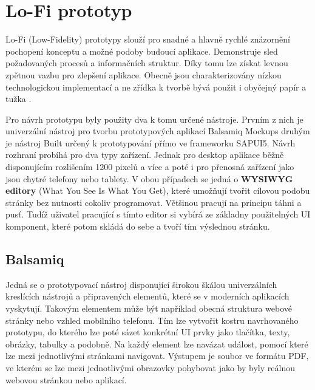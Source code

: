 \documentclass[thesis=M,czech]{FITthesis}[2012/06/26]
\begin{document}
\section{Lo-Fi prototyp}
\label{sec:lofi}
Lo-Fi (Low-Fidelity) prototypy slouží pro snadné a hlavně rychlé znázornění pochopení konceptu a možné podoby budoucí aplikace. Demonstruje sled požadovaných procesů a informačních struktur. Díky tomu lze získat levnou zpětnou vazbu pro zlepšení aplikace. Obecně jsou charakterizovány nízkou technologickou implementací a ne zřídka k tvorbě bývá použit i obyčejný papír a tužka \cite{lofi}. 

Pro návrh prototypu byly použity dva k tomu určené nástroje. Prvním z nich je univerzální nástroj pro tvorbu prototypových aplikací Balsamiq Mockups \cite{balsamiq} druhým je nástroj Built \cite{builtme} určený k prototypování přímo ve frameworku SAPUI5. Návrh rozhraní probíhá pro dva typy zařízení. Jednak pro desktop aplikace běžně disponujícím rozlišením 1200 pixelů a více a poté i pro přenosná zařízení jako jsou chytré telefony nebo tablety. V obou případech se jedná o \textbf{WYSIWYG editory} (What You See Is What You Get), které umožňují tvořit cílovou podobu stránky bez nutnosti cokoliv programovat. Většinou pracují na principu táhni a pusť. Tudíž uživatel pracující s tímto editor si vybírá ze základny použitelných UI komponent, které potom skládá do sebe a tvoří tím výslednou stránku. 
\subsection{Balsamiq}
Jedná se o prototypovací nástroj disponující širokou škálou univerzálních kreslících nástrojů a připravených elementů, které se v moderních aplikacích vyskytují. Takovým elementem může být například obecná struktura webové stránky nebo vzhled mobilního telefonu. Tím lze vytvořit kostru navrhovaného prototypu, do kterého lze poté sázet konkrétní UI prvky jako tlačítka, texty, obrázky, tabulky a podobně. Na každý element lze navázat událost, pomocí které lze mezi jednotlivými stránkami navigovat. Výstupem je soubor ve formátu PDF, ve kterém se lze mezi jednotlivými obrazovky pohybovat jako by byly reálnou webovou stránkou nebo aplikací. 
\end{document}

